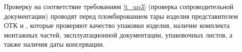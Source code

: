 Проверку на соответствие требованиям \ref{t_up3} (проверка сопроводительной документации) проводят перед пломбированием тары изделия представителем ОТК и \client, которые проверяют качество упаковки изделия, наличие комплекта монтажных частей, эксплуатационной документации, упаковочных листов, а также наличия даты консервации.

